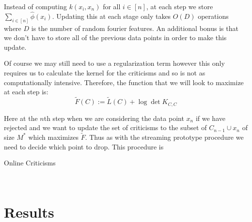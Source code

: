 \documentclass{article}
\begin{document}
	Instead of computing $k(x_i, x_n)$ for all $i \in \left[ n \right]$, at each step we store $\sum_{i \in \left[ n \right]}\hat{\phi}(x_i)$. Updating this at each stage only takes $O(D)$ operations where $D$ is the number of random fourier features. An additional bonus is that we don't have to store all of the previous data points in order to make this update.
	
	Of course we may still need to use a regularization term however this only requires us to calculate the kernel for the criticisms and so is not as computationally intensive. Therefore, the function that we will  look to maximize at each step is:
	\begin{equation}
	\tilde{F}(C) := \tilde{L}(C) + \log \det K_{C,C}
	\end{equation}
	
	Here at the $n$th step when we are considering the data point $x_n$ if we have rejected and we want to update the set of criticisms to the subset of $C_{n-1} \cup x_n$ of size $M^*$ which maximizes $\tilde{F}$. Thus as with the streaming prototype procedure we need to decide which point to drop. This procedure is 
	
	\begin{algorithm}
		\caption{Online Criticisms}\label{greedy}
		\begin{algorithmic}[1]
			\\
		\end{algorithmic}
	\end{algorithm}
	
	\section{Results}
	
\end{document}
